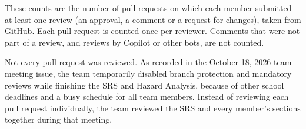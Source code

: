 \documentclass{article}
\begin{document}
These counts are the number of pull requests on which each member submitted at
least one review (an approval, a comment or a request for changes), taken from
GitHub. Each pull request is counted once per reviewer. Comments that were not
part of a review, and reviews by Copilot or other bots, are not counted.

Not every pull request was reviewed. As recorded in the October 18, 2026 team
meeting issue, the team temporarily disabled branch protection and mandatory
reviews while finishing the SRS and Hazard Analysis, because of other school
deadlines and a busy schedule for all team members. Instead of reviewing each
pull request individually, the team reviewed the SRS and every member's
sections together during that meeting.
\end{document}
